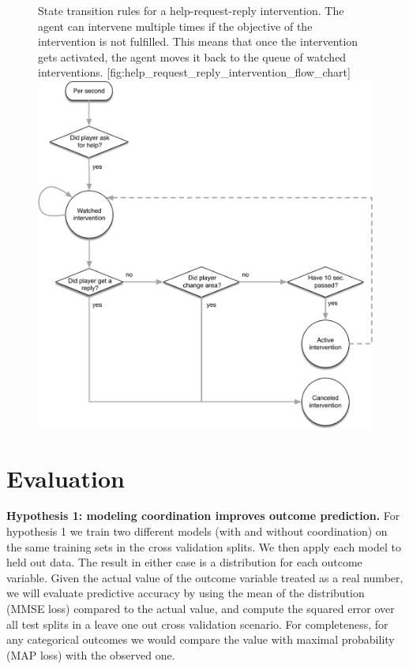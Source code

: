 %
\begin{figure}
    \begin{sidecaption}{%
        State transition rules for a help-request-reply intervention.
        The agent can intervene multiple times if the objective of the
        intervention is not fulfilled. This means that once the intervention
        gets activated, the agent moves it back to the queue of watched
        interventions.
    }[fig:help_request_reply_intervention_flow_chart]
    \includegraphics[width=\textwidth]{images/help_request_reply_intervention_flow_chart.pdf}
    \end{sidecaption}
\end{figure}
%

\section{Evaluation}

\textbf{Hypothesis 1: modeling coordination improves outcome prediction.}  For
hypothesis 1 we train two different models (with and without coordination) on
the same training sets in the cross validation splits. We then apply each model
to held out data. The result in either case is a distribution for each outcome
variable. Given the actual value of the outcome variable treated as a real
number, we will evaluate predictive accuracy by using the mean of the
distribution (MMSE loss) compared to the actual value, and compute the squared
error over all test splits in a leave one out cross validation scenario. For
completeness, for any categorical outcomes we would compare the value with
maximal probability (MAP loss) with the observed one. \\

